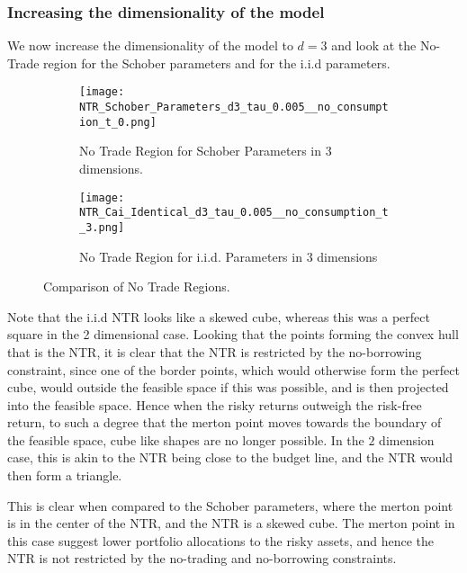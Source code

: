 \documentclass[11pt]{article}
\begin{document}
\subsubsection{Increasing the dimensionality of the model} \label{Subsubsection: IncreasingDimensionality}
We now increase the dimensionality of the model to $d = 3$ and look at the No-Trade region for the Schober parameters and for the i.i.d parameters.

\begin{figure}[!ht]
    \centering
    \begin{subfigure}[t]{0.48\textwidth}
        \centering
        \texttt{[image: NTR\_Schober\_Parameters\_d3\_tau\_0.005\_\_no\_consumption\_t\_0.png]}
        \caption{No Trade Region for Schober Parameters in 3 dimensions.}
        \label{fig:NTR_3d_Schober}
    \end{subfigure}%
    \hfill
    \begin{subfigure}[t]{0.48\textwidth}
        \centering
        \texttt{[image: NTR\_Cai\_Identical\_d3\_tau\_0.005\_\_no\_consumption\_t\_3.png]}
        \caption{No Trade Region for i.i.d. Parameters in 3 dimensions}
        \label{fig:NTR_3d_iid_Correlation}
    \end{subfigure}

    \caption{Comparison of No Trade Regions.}
    \label{fig:comparison_NTR_3d}
\end{figure}
Note that the i.i.d NTR looks like a skewed cube, whereas this was a perfect square in the 2 dimensional case.
Looking that the points forming the convex hull that is the NTR, it is clear that the NTR is restricted by the no-borrowing constraint,
since one of the border points, which would otherwise form the perfect cube, would outside the feasible space if this was possible, and is then projected into the feasible space. 
Hence when the risky returns outweigh the risk-free return,
to such a degree that the merton point moves towards the boundary of the feasible space, cube like shapes are no longer possible.
In the $2$ dimension case, this is akin to the \ac{NTR} being close to the budget line, and the \ac{NTR} would then form a triangle.

This is clear when compared to the Schober parameters, where the merton point is in the center of the NTR, and the NTR is a skewed cube.
The merton point in this case suggest lower portfolio allocations to the risky assets, and hence the NTR is not restricted by the no-trading and no-borrowing constraints.
\end{document}
